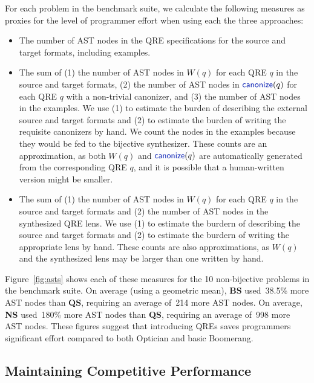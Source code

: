 \documentclass[acmsmall,screen]{acmart}
\newcommand{\kw}[1]{\textcolor{dkblue}{\ensuremath{\mathsf{#1}}}}
\newcommand{\canonize}{\ensuremath{\kw{canonize}}}
\newcommand{\QRESize}{\textbf{QS}}
\newcommand{\canonizeAndSpecSize}{\textbf{BS}}
\newcommand{\LensAndSpecSize}{\textbf{NS}}
\begin{document}
For each problem in the benchmark suite, we calculate the following
measures as proxies for the level of programmer effort when using each
the three approaches:

%
\begin{itemize}
  \item[\QRESize{}:] 
  The number of AST nodes in the QRE specifications for the source and
  target formats, including examples. 
  \item[\canonizeAndSpecSize{}:] 
  The sum of (1) the number of AST nodes in $W(q)$ for each QRE $q$ in the source and target
  formats, (2) the number of AST nodes in $\canonize(q)$ for each QRE $q$ with a
  non-trivial canonizer, and (3) the number of AST nodes in the
  examples.  We use (1) to estimate the burden of describing
  the external source and target formats and (2) to estimate the
  burden of writing the requisite canonizers
  by hand.  We count the nodes in the examples because they would be
  fed to the bijective synthesizer.  
  These counts are an approximation, as both $W(q)$ and $\canonize(q)$ are
  automatically generated from the corresponding QRE $q$, and it is
  possible that a human-written version might be smaller.
  \item[\LensAndSpecSize{}:] The sum of (1) the number of AST nodes in
  $W(q)$ for each QRE $q$ in the source and target formats and (2) the
  number of AST nodes in the synthesized QRE lens.  We use (1) to
  estimate the burdern of describing the source and target formats
  and (2) to estimate the burdern of writing the appropriate lens by
  hand. These counts are also approximations, as
  $W(q)$ and the synthesized lens may be larger than one written by hand.
\end{itemize}

Figure~\ref{fig:asts} shows each of these measures for the 10
non-bijective problems in the benchmark suite.  On
average (using a geometric mean), \canonizeAndSpecSize{} used~38.5\% more AST nodes
than \QRESize{}, requiring an average of~214 more AST nodes. On 
average, \LensAndSpecSize{} used~180\% more AST nodes than \QRESize{}, requiring an
average of~998 more AST nodes. These figures suggest that introducing QREs saves
programmers significant effort compared to both Optician and basic
Boomerang.

\subsection{Maintaining Competitive Performance}
\end{document}
